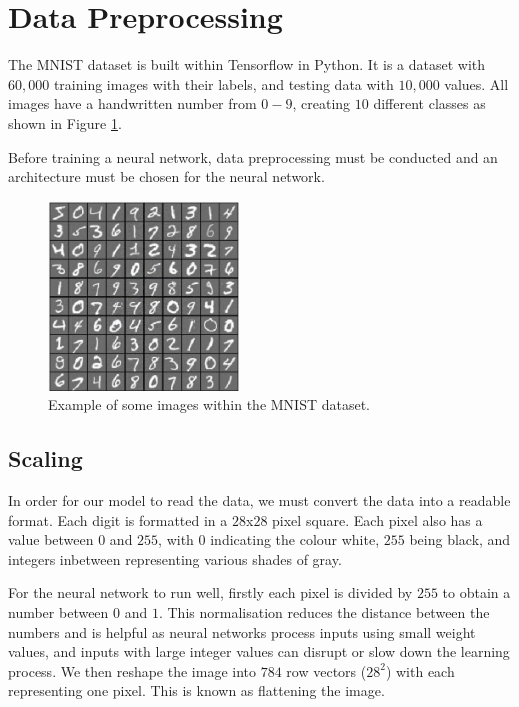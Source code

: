 \documentclass[a4paper,11pt]{article}
\theoremstyle{plain} %
\theoremstyle{definition} %
\theoremstyle{remark} %
\begin{document}
\section{Data Preprocessing}

The MNIST dataset is built within Tensorflow in Python. It is a dataset with $60,000$ training images with their labels, and testing data with $10,000$ values. All images have a handwritten number from $0-9$, creating $10$ different classes as shown in Figure \cref{MNIST}.

Before training a neural network, data preprocessing must be conducted and an architecture must be chosen for the neural network.

\begin{figure}[htb]
	\centering 
	\includegraphics[width=0.45\textwidth, angle=0]{Picture2.png}	
	\caption{Example of some images within the MNIST dataset.} 
	\label{MNIST}%
\end{figure}
\subsection{Scaling}

In order for our model to read the data, we must convert the data into a readable format. Each digit is formatted in a $28$x$28$ pixel square. Each pixel also has a value between $0$ and $255$, with $0$ indicating the colour white, $255$ being black, and integers inbetween representing various shades of gray. 

For the neural network to run well, firstly each pixel is divided by $255$ to obtain a number between $0$ and $1$. This normalisation reduces the distance between the numbers and is helpful as neural networks process inputs using small weight values, and inputs with large integer values can disrupt or slow down the learning process. We then reshape the image into $784$ row vectors ($28^2$) with each representing one pixel. This is known as flattening the image.
\end{document}
